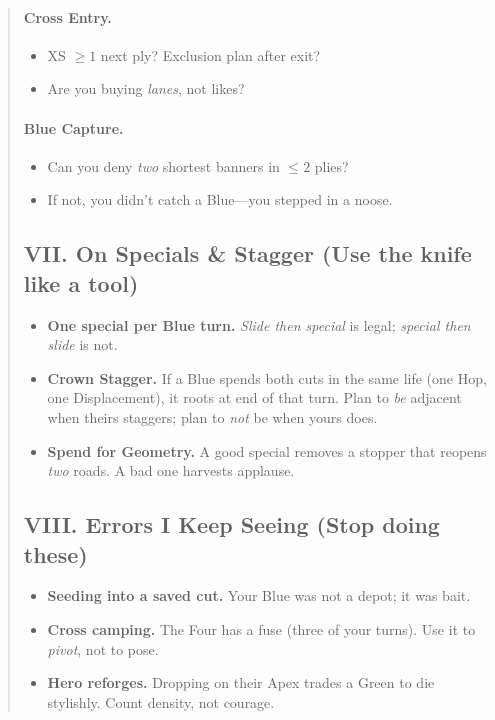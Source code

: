 \documentclass[11pt]{article}
\begin{document}
\begin{quote}
\paragraph{Cross Entry.}
\begin{itemize}\itemsep0.15em
  \item XS $\ge 1$ next ply? Exclusion plan after exit?
  \item Are you buying \emph{lanes}, not likes?
\end{itemize}
\paragraph{Blue Capture.}
\begin{itemize}\itemsep0.15em
  \item Can you deny \emph{two} shortest banners in $\le 2$ plies?
  \item If not, you didn’t catch a Blue—you stepped in a noose.
\end{itemize}

\subsection{VII. On Specials \& Stagger (Use the knife like a tool)}
\begin{itemize}\itemsep0.2em
  \item \textbf{One special per Blue turn.} \emph{Slide then special} is legal; \emph{special then slide} is not.
  \item \textbf{Crown Stagger.} If a Blue spends both cuts in the same life (one Hop, one Displacement), it roots at end of that turn. Plan to \emph{be} adjacent when theirs staggers; plan to \emph{not} be when yours does.
  \item \textbf{Spend for Geometry.} A good special removes a stopper that reopens \emph{two} roads. A bad one harvests applause.
\end{itemize}

\subsection{VIII. Errors I Keep Seeing (Stop doing these)}
\begin{itemize}\itemsep0.2em
  \item \textbf{Seeding into a saved cut.} Your Blue was not a depot; it was bait.
  \item \textbf{Cross camping.} The Four has a fuse (three of your turns). Use it to \emph{pivot}, not to pose.
  \item \textbf{Hero reforges.} Dropping on their Apex trades a Green to die stylishly. Count density, not courage.
\end{itemize}


\end{quote}
\end{document}
